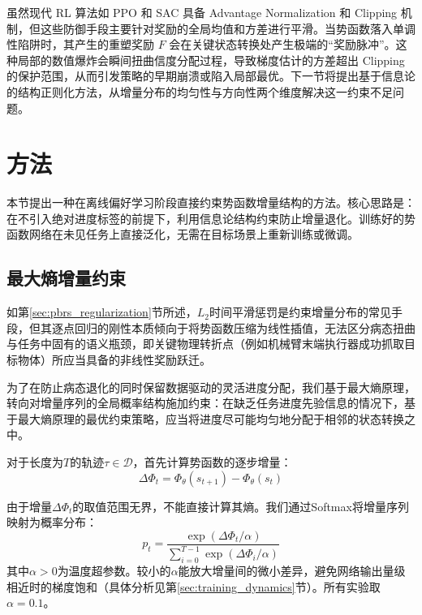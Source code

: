 虽然现代 RL 算法如 PPO \cite{schulman2017} 和 SAC \cite{haarnoja2018} 具备 Advantage Normalization 和 Clipping 机制，但这些防御手段主要针对奖励的全局均值和方差进行平滑。当势函数落入单调性陷阱时，其产生的重塑奖励 $F$ 会在关键状态转换处产生极端的“奖励脉冲”。这种局部的数值爆炸会瞬间扭曲信度分配过程，导致梯度估计的方差超出 Clipping 的保护范围，从而引发策略的早期崩溃或陷入局部最优。下一节将提出基于信息论的结构正则化方法，从增量分布的均匀性与方向性两个维度解决这一约束不足问题。

\section{方法}

本节提出一种在离线偏好学习阶段直接约束势函数增量结构的方法。核心思路是：在不引入绝对进度标签的前提下，利用信息论结构约束防止增量退化。训练好的势函数网络在未见任务上直接泛化，无需在目标场景上重新训练或微调。

\subsection{最大熵增量约束}

如第\ref{sec:pbrs_regularization}节所述，$L_2$时间平滑惩罚是约束增量分布的常见手段，但其逐点回归的刚性本质倾向于将势函数压缩为线性插值，无法区分病态扭曲与任务中固有的语义瓶颈，即关键物理转折点（例如机械臂末端执行器成功抓取目标物体）所应当具备的非线性奖励跃迁。

为了在防止病态退化的同时保留数据驱动的灵活进度分配，我们基于最大熵原理\cite{shannon1948,jaynes1957}，转向对增量序列的全局概率结构施加约束：在缺乏任务进度先验信息的情况下，基于最大熵原理的最优约束策略，应当将进度尽可能均匀地分配于相邻的状态转换之中。

对于长度为$T$的轨迹$\tau \in \mathcal{D}$，首先计算势函数的逐步增量：
\begin{equation}
\label{eq:delta_phi}
    \Delta\Phi_t = \Phi_\theta(s_{t+1}) - \Phi_\theta(s_t)
\end{equation}

由于增量$\Delta\Phi_t$的取值范围无界，不能直接计算其熵。我们通过Softmax将增量序列映射为概率分布：
\begin{equation}
\label{eq:softmax}
    p_t = \frac{\exp(\Delta\Phi_t / \alpha)}{\sum_{i=0}^{T-1} \exp(\Delta\Phi_i / \alpha)}
\end{equation}
其中$\alpha > 0$为温度超参数。较小的$\alpha$能放大增量间的微小差异，避免网络输出量级相近时的梯度饱和（具体分析见第\ref{sec:training_dynamics}节）。所有实验取$\alpha = 0.1$。

